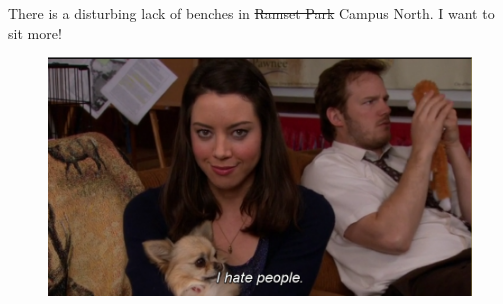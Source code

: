 There is a disturbing lack of benches in \sout{Ramset Park} Campus North. I want to sit more!

\begin{figure}[tbh]
	\includegraphics[width=\textwidth]{chap/06-conclusion/img/april}
\end{figure}

\newpage
